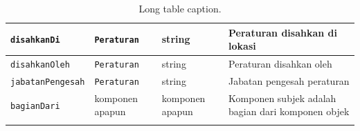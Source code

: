 \begin{longtable}{|p{}|p{}|p{}|p{}|}
  \texttt{disahkanDi}      & \texttt{Peraturan}                                                                                                  & string                                                & Peraturan disahkan di lokasi                      \\ \hline
  \texttt{disahkanOleh}    & \texttt{Peraturan}                                                                                                  & string                                                & Peraturan disahkan oleh                           \\ \hline
  \texttt{jabatanPengesah} & \texttt{Peraturan}                                                                                                  & string                                                & Jabatan pengesah peraturan                        \\ \hline
  \texttt{bagianDari}      & komponen apapun                                                                                                     & komponen apapun                                       & Komponen subjek adalah bagian dari komponen objek \\ \hline
  \caption{Long table caption.\label{long}}                                                                                                                                                                                                                  \\
\end{longtable}
